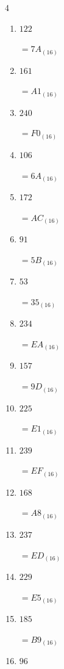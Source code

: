 \begin{multicols}{4}
\begin{enumerate}
        $=68_{(16)}$

  \item $122$

        $=7A_{(16)}$

  \item $161$

        $=A1_{(16)}$

  \item $240$

        $=F0_{(16)}$

\columnbreak %

\resetques

  \item $106$

        $=6A_{(16)}$

  \item $172$

        $=AC_{(16)}$

  \item $91$

        $=5B_{(16)}$

  \item $53$

        $=35_{(16)}$

  \item $234$

        $=EA_{(16)}$

  \item $157$

        $=9D_{(16)}$

  \item $225$

        $=E1_{(16)}$

  \item $239$

        $=EF_{(16)}$

  \item $168$

        $=A8_{(16)}$

  \item $237$

        $=ED_{(16)}$

  \item $229$

        $=E5_{(16)}$

  \item $185$

        $=B9_{(16)}$

  \item $96$


\end{enumerate}
\end{multicols}
